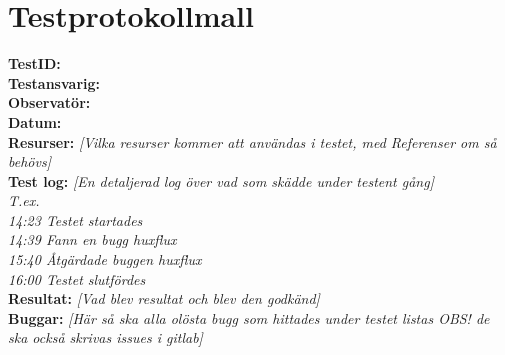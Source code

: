 \documentclass[a4paper,10pt]{article}
\begin{document}
\newpage

\section{Testprotokollmall} 
\label{sec: Testprotokollmall}


 \textbf{TestID:}
\\ \textbf{Testansvarig:\\Observatör:}
\\ \textbf{Datum:}
\\ \textbf{Resurser:} \emph{[Vilka resurser kommer att användas i testet, med Referenser om så behövs]}
\\ \textbf{Test log:} \emph{[En detaljerad log över vad som skädde under testent gång]\\ T.ex. \\ 14:23 Testet startades \\ 14:39 Fann en bugg huxflux \\ 15:40 Åtgärdade buggen huxflux \\ 16:00 Testet slutfördes}\
\\ \textbf{Resultat:} \emph{[Vad blev resultat och blev den godkänd]}
\\ \textbf{Buggar:} \emph{[Här så ska alla olösta bugg som hittades under testet listas OBS! de ska också skrivas issues i gitlab]}
\end{document}
